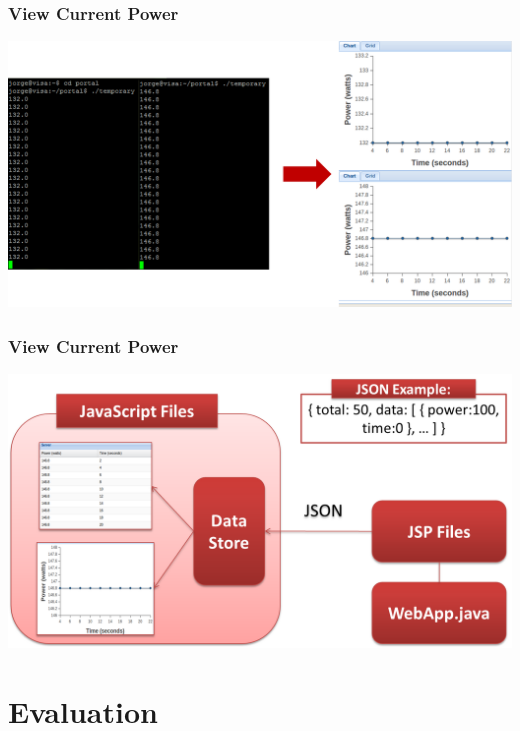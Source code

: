 \documentclass{beamer}
\begin{document}
\begin{frame}
  \frametitle{View Current Power}

  \includegraphics[width=\textwidth,keepaspectratio]{reading-power.png}

\end{frame}

\begin{frame}
  \frametitle{View Current Power}

  \includegraphics[width=\textwidth,keepaspectratio]{json.png}

\end{frame}

\section{Evaluation}
\end{document}
